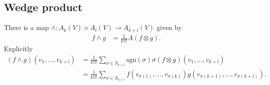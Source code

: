 \subsection{Wedge product}
There is a map
$\wedge : A_k(V) \times A_l(V) \to A_{k + l}(V)$
given by
\begin{align*}
   f \wedge g
&= \frac{1}{k! l!}
     A(f \otimes g).
\end{align*}
Explicitly
\begin{align*}
   (f \wedge g)(v_1, \dots, v_{k+l})
&= \frac{1}{k! l!}
     \sum_{\sigma \in S_{k+l}}
       \mathrm{sgn}(\sigma)
       \sigma(f \otimes g)
         (v_1, \dots, v_{k+l}) \\
&= \frac{1}{k! l!}
     \sum_{\sigma \in S_{k+l}}
       f(v_{\sigma(1)}, \dots, v_{\sigma(k)})
       g(v_{\sigma(k+1)}, \dots, v_{\sigma(k+l)}).
\end{align*}

